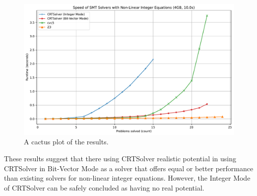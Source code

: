 \begin{figure}
    \vspace{4em}
    \centering
    \includegraphics[width=1.0\linewidth]{cactus.pdf}
  \caption{A cactus plot of the results.}
  \label{figure:cactus-plot}
\end{figure}

These results suggest that there using CRTSolver realistic potential in using CRTSolver in Bit-Vector Mode
as a solver that offers equal or better performance than existing solvers for non-linear
integer equations. However, the Integer Mode of CRTSolver can be safely concluded as having no real potential.

